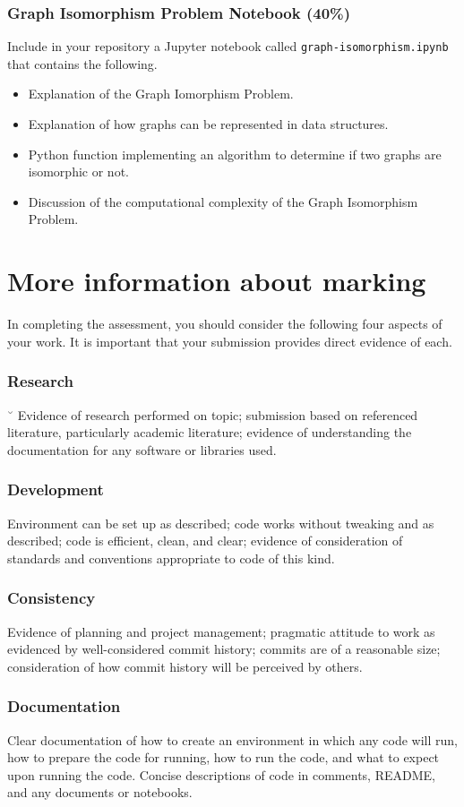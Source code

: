 \documentclass[a4paper, 12pt]{scrartcl}
\begin{document}
  \subsubsection*{Graph Isomorphism Problem Notebook (40\%)}
  Include in your repository a Jupyter notebook called \texttt{graph-isomorphism.ipynb} that contains the following.
  \begin{itemize}
    \item Explanation of the Graph Iomorphism Problem.
    \item Explanation of how graphs can be represented in data structures.
    \item Python function implementing an algorithm to determine if two graphs are isomorphic or not.
    \item Discussion of the computational complexity of the Graph Isomorphism Problem.
  \end{itemize}

  \section*{More information about marking}
    In completing the assessment, you should consider the following four aspects of your work.
    It is important that your submission provides direct evidence of each.
    
    \subsubsection*{Research}˘
    Evidence of research performed on topic; submission based on referenced literature, particularly academic literature; evidence of understanding the documentation for any software or libraries used.
    \subsubsection*{Development}
    Environment can be set up as described; code works without tweaking and as described; code is efficient, clean, and clear; evidence of consideration of standards and conventions appropriate to code of this kind.
    \subsubsection*{Consistency}
    Evidence of planning and project management; pragmatic attitude to work as evidenced by well-considered commit history; commits are of a reasonable size; consideration of how commit history will be perceived by others.
    \subsubsection*{Documentation}
    Clear documentation of how to create an environment in which any code will run, how to prepare the code for running, how to run the code, and what to expect upon running the code. Concise descriptions of code in comments, README, and any documents or notebooks.
    
  
  
  
\end{document}
